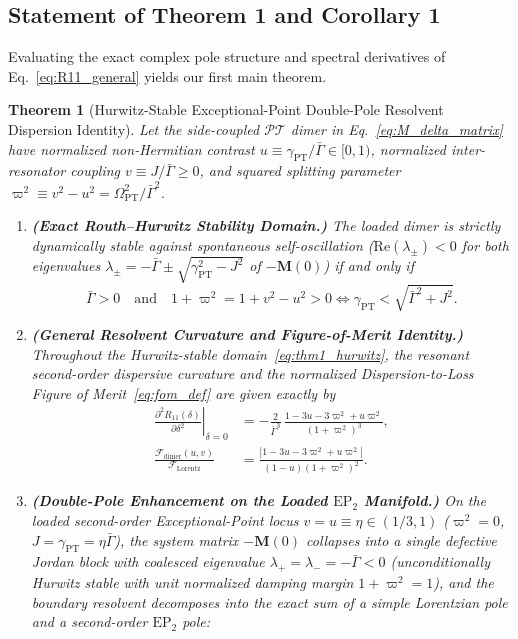 \documentclass[11pt,letterpaper]{article}
\newtheorem{theorem}{Theorem}
\theoremstyle{definition}
\theoremstyle{remark}
\begin{document}
\subsection{Statement of Theorem 1 and Corollary 1}

Evaluating the exact complex pole structure and spectral derivatives of Eq.~\eqref{eq:R11_general} yields our first main theorem.

\begin{theorem}[Hurwitz-Stable Exceptional-Point Double-Pole Resolvent Dispersion Identity]
\label{thm:ep2_dispersion}
Let the side-coupled $\mathcal{PT}$ dimer in Eq.~\eqref{eq:M_delta_matrix} have normalized non-Hermitian contrast $u \equiv \gamma_{\mathrm{PT}}/\bar{\Gamma} \in [0, 1)$, normalized inter-resonator coupling $v \equiv J/\bar{\Gamma} \ge 0$, and squared splitting parameter $\varpi^2 \equiv v^2 - u^2 = \Omega_{\mathrm{PT}}^2/\bar{\Gamma}^2$.
\begin{enumerate}
    \item[(a)] \textbf{(Exact Routh--Hurwitz Stability Domain.)} The loaded dimer is strictly dynamically stable against spontaneous self-oscillation ($\mathrm{Re}(\lambda_\pm) < 0$ for both eigenvalues $\lambda_\pm = -\bar{\Gamma} \pm \sqrt{\gamma_{\mathrm{PT}}^2 - J^2}$ of $-\mathbf{M}(0)$) if and only if
    \begin{equation}
    \bar{\Gamma} > 0 \quad \text{and} \quad 1 + \varpi^2 = 1 + v^2 - u^2 > 0 \iff \gamma_{\mathrm{PT}} < \sqrt{\bar{\Gamma}^2 + J^2}.
    \label{eq:thm1_hurwitz}
    \end{equation}
    \item[(b)] \textbf{(General Resolvent Curvature and Figure-of-Merit Identity.)} Throughout the Hurwitz-stable domain~\eqref{eq:thm1_hurwitz}, the resonant second-order dispersive curvature and the normalized Dispersion-to-Loss Figure of Merit~\eqref{eq:fom_def} are given exactly by
    \begin{align}
    \left.\frac{\partial^2 R_{11}(\delta)}{\partial \delta^2}\right|_{\delta=0} &= -\frac{2}{\bar{\Gamma}^3}\,\frac{1 - 3u - 3\varpi^2 + u\varpi^2}{\left(1 + \varpi^2\right)^3}, \label{eq:thm1_d2R11}\\
    \frac{\mathcal{F}_{\mathrm{dimer}}(u, v)}{\mathcal{F}_{\mathrm{Lorentz}}} &= \frac{\left|1 - 3u - 3\varpi^2 + u\varpi^2\right|}{(1 - u)\left(1 + \varpi^2\right)^2}. \label{eq:thm1_fom_general}
    \end{align}
    \item[(c)] \textbf{(Double-Pole Enhancement on the Loaded $\mathrm{EP}_2$ Manifold.)} On the loaded second-order Exceptional-Point locus $v = u \equiv \eta \in (1/3, 1)$ ($\varpi^2 = 0$, $J = \gamma_{\mathrm{PT}} = \eta\bar{\Gamma}$), the system matrix $-\mathbf{M}(0)$ collapses into a single defective Jordan block with coalesced eigenvalue $\lambda_+ = \lambda_- = -\bar{\Gamma} < 0$ (unconditionally Hurwitz stable with unit normalized damping margin $1 + \varpi^2 = 1$), and the boundary resolvent decomposes into the exact sum of a simple Lorentzian pole and a second-order $\mathrm{EP}_2$ pole:

\end{enumerate}
\end{theorem}
\end{document}
